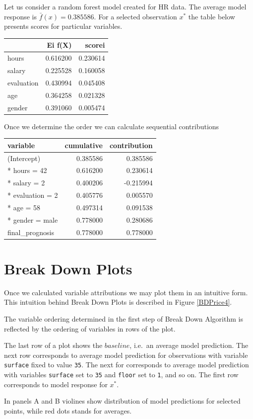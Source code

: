 \documentclass[]{book}
\theoremstyle{definition}
\theoremstyle{definition}
\theoremstyle{definition}
\theoremstyle{remark}
\begin{document}
Let us consider a random forest model created for HR data. The average
model response is \(\bar f(x) = 0.385586\). For a selected observation
\(x^*\) the table below presents scores for particular variables.

\begin{longtable}[]{@{}lrr@{}}
\toprule
& Ei f(X) & scorei\tabularnewline
\midrule
\endhead
hours & 0.616200 & 0.230614\tabularnewline
salary & 0.225528 & 0.160058\tabularnewline
evaluation & 0.430994 & 0.045408\tabularnewline
age & 0.364258 & 0.021328\tabularnewline
gender & 0.391060 & 0.005474\tabularnewline
\bottomrule
\end{longtable}

Once we determine the order we can calculate sequential contributions

\begin{longtable}[]{@{}lrr@{}}
\toprule
variable & cumulative & contribution\tabularnewline
\midrule
\endhead
(Intercept) & 0.385586 & 0.385586\tabularnewline
* hours = 42 & 0.616200 & 0.230614\tabularnewline
* salary = 2 & 0.400206 & -0.215994\tabularnewline
* evaluation = 2 & 0.405776 & 0.005570\tabularnewline
* age = 58 & 0.497314 & 0.091538\tabularnewline
* gender = male & 0.778000 & 0.280686\tabularnewline
final\_prognosis & 0.778000 & 0.778000\tabularnewline
\bottomrule
\end{longtable}

\hypertarget{break-down-plots}{%
\section{Break Down Plots}\label{break-down-plots}}

Once we calculated variable attributions we may plot them in an
intuitive form. This intuition behind Break Down Plots is described in
Figure \ref{BDPrice4}.

The variable ordering determined in the first step of Break Down
Algorithm is reflected by the ordering of variables in rows of the plot.

The last row of a plot shows the \(baseline\), i.e.~an average model
prediction. The next row corresponds to average model prediction for
observations with variable \texttt{surface} fixed to value \texttt{35}.
The next for corresponds to average model prediction with variables
\texttt{surface} set to \texttt{35} and \texttt{floor} set to
\texttt{1}, and so on. The first row corresponds to model response for
\(x^*\).

In panels A and B violines show distribution of model predictions for
selected points, while red dots stands for averages.
\end{document}
